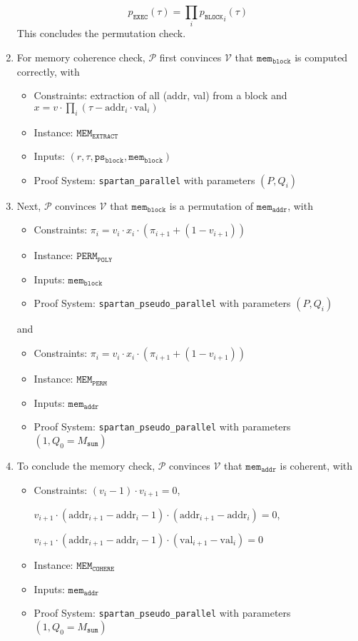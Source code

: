 \documentclass{article}
\newcommand{\code}{\texttt}
\newcommand{\Msum}{M_{\mathtt{sum}}}
\renewcommand{\P}{\mathcal{P}}
\newcommand{\V}{\mathcal{V}}
\newcommand{\MEME}{\mathtt{MEM_{EXTRACT}}}
\newcommand{\MEMC}{\mathtt{MEM_{COHERE}}}
\newcommand{\psb}{\mathtt{ps_{block}}}
\newcommand{\memb}{\mathtt{mem_{block}}}
\newcommand{\mema}{\mathtt{mem_{addr}}}
\newcommand{\addr}{\mbox{addr}}
\newcommand{\val}{\mbox{val}}
\begin{document}
\begin{enumerate}
    $$p_\mathtt{EXEC}(\tau) = \prod_i {p_\mathtt{BLOCK}}_i(\tau)$$
    This concludes the permutation check.
    \item For memory coherence check, $\P$ first convinces $\V$ that $\memb$ is computed correctly, with
    \begin{itemize}
        \item Constraints: extraction of all (addr, val) from a block and $x = v\cdot \prod_i (\tau - \addr_i \cdot \val_i)$
        \item Instance: $\MEME$
        \item Inputs: $(r, \tau, \psb, \memb)$
        \item Proof System: \code{spartan\_parallel} with parameters $(P, Q_i)$
    \end{itemize}
    \item Next, $\P$ convinces $\V$ that $\memb$ is a permutation of $\mema$, with
    \begin{itemize}
        \item Constraints: $\pi_i = v_i \cdot x_i \cdot (\pi_{i+1} + (1 - v_{i+1}))$
        \item Instance: $\mathtt{PERM}_\mathtt{POLY}$
        \item Inputs: $\memb$
        \item Proof System: \code{spartan\_pseudo\_parallel} with parameters $(P, Q_i)$
    \end{itemize}
    and
    \begin{itemize}
        \item Constraints: $\pi_i = v_i \cdot x_i \cdot (\pi_{i+1} + (1 - v_{i+1}))$
        \item Instance: $\mathtt{MEM}_\mathtt{PERM}$
        \item Inputs: $\mema$
        \item Proof System: \code{spartan\_pseudo\_parallel} with parameters $(1, Q_0 = \Msum)$
    \end{itemize}
    \item To conclude the memory check, $\P$ convinces $\V$ that $\mema$ is coherent, with
    \begin{itemize}
        \item Constraints: $(v_i - 1) \cdot v_{i+1} = 0$,

        $v_{i + 1} \cdot (\addr_{i + 1} - \addr_i - 1) \cdot (\addr_{i + 1} - \addr_i) = 0$,

        $v_{i + 1} \cdot (\addr_{i + 1} - \addr_i - 1) \cdot (\val_{i + 1} - \val_i) = 0$
        \item Instance: $\MEMC$
        \item Inputs: $\mema$
        \item Proof System: \code{spartan\_pseudo\_parallel} with parameters $(1, Q_0 = \Msum)$
    \end{itemize}


\end{enumerate}
\end{document}
